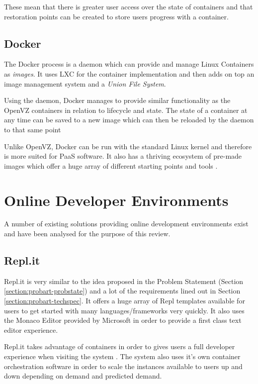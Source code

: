 These mean that there is greater user access over the state of containers and that restoration points can be created to store users progress with a container.

\subsection{Docker}

The Docker process is a daemon which can provide and manage Linux Containers as \textit{images}. It uses LXC for the container implementation and then adds on top an image management system and a \textit{Union File System}.

Using the daemon, Docker manages to provide similar functionality as the OpenVZ containers in relation to lifecycle and state. The state of a container at any time can be saved to a new image which can then be reloaded by the daemon to that same point

Unlike OpenVZ, Docker can be run with the standard Linux kernel and therefore is more suited for PaaS software. It also has a thriving ecosystem of pre-made images which offer a huge array of different starting points and tools \cite{dockerhub}.

\section{Online Developer Environments} \label{lit-ode}

A number of existing solutions providing online development environments exist and have been analysed for the purpose of this review.

\subsection{Repl.it}

Repl.it is very similar to the idea proposed in the Problem Statement (Section \ref{section:probart-probstate}) and a lot of the requirements lined out in Section \ref{section:probart-techspec}. It offers a huge array of Repl templates available for users to get started with many languages/frameworks very quickly. It also uses the Monaco Editor provided by Microsoft in order to provide a first class text editor experience.

Repl.it takes advantage of containers in order to gives users a full developer experience when visiting the system \cite{replit-containers}. The system also uses it's own container orchestration software in order to scale the instances available to users up and down depending on demand and predicted demand.

